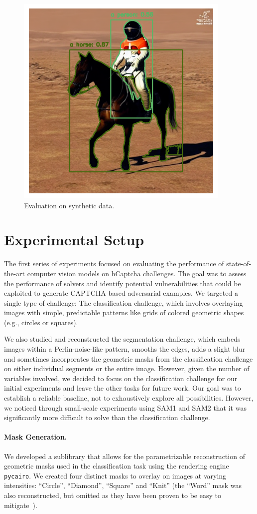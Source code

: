 \documentclass[a4paper, oneside]{discothesis}
\begin{document}
\begin{figure}
	\centering
	\includegraphics[width=0.3\columnwidth]{figures/chained.png}
	\caption{Evaluation on synthetic data.}
	\label{fig:chained}
\end{figure}

\section{Experimental Setup}

The first series of experiments focused on evaluating the performance of state-of-the-art computer vision models on hCaptcha challenges. The goal was to assess the performance of solvers and identify potential vulnerabilities that could be exploited to generate CAPTCHA based adversarial examples. We targeted a single type of challenge: The classification challenge, which involves overlaying images with simple, predictable patterns like grids of colored geometric shapes (e.g., circles or squares).

We also studied and reconstructed the segmentation challenge, which embeds images within a Perlin-noise-like pattern, smooths the edges, adds a slight blur and sometimes incorporates the geometric masks from the classification challenge on either individual segments or the entire image. However, given the number of variables involved, we decided to focus on the classification challenge for our initial experiments and leave the other tasks for future work. Our goal was to establish a reliable baseline, not to exhaustively explore all possibilities. However, we noticed through small-scale experiments using SAM1 and SAM2 that it was significantly more difficult to solve than the classification challenge.

\paragraph{Mask Generation.}

We developed a sublibrary that allows for the parametrizable reconstruction of geometric masks used in the classification task using the rendering engine \texttt{pycairo}. We created four distinct masks to overlay on images at varying intensities: ``Circle'', ``Diamond'', ``Square'' and ``Knit'' (the ``Word'' mask was also reconstructed, but omitted as they have been proven to be easy to mitigate~\cite{zhang2023text,dong2023robust,shayegani2023plug}).
\end{document}

